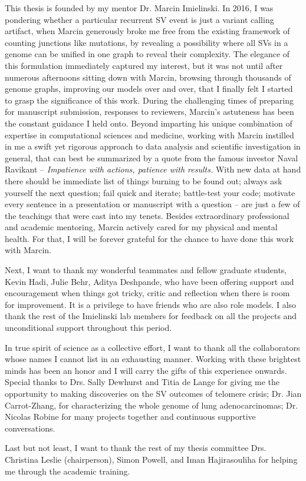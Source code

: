 \documentclass[phd,tocprelim]{cornell}
\begin{document}
\begin{acknowledgements}
    This thesis is founded by my mentor Dr. Marcin Imielinski. In 2016, I was pondering whether a particular recurrent SV event is just a variant calling artifact, when Marcin generously broke me free from the existing framework of counting junctions like mutations, by revealing a possibility where all SVs in a genome can be unified in one graph to reveal their complexity. The elegance of this formulation immediately captured my interest, but it was not until after numerous afternoons sitting down with Marcin, browsing through thousands of genome graphs, improving our models over and over, that I finally felt I started to grasp the significance of this work. During the challenging times of preparing for manuscript submission, responses to reviewers, Marcin's astuteness has been the constant guidance I held onto. Beyond imparting his unique combination of expertise in computational sciences and medicine, working with Marcin instilled in me a swift yet rigorous approach to data analysis and scientific investigation in general, that can best be summarized by a quote from the famous investor Naval Ravikant -- \textit{Impatience with actions, patience with results.} With new data at hand there should be immediate list of things burning to be found out; always ask yourself the next question; fail quick and iterate; battle-test your code; motivate every sentence in a presentation or manuscript with a question -- are just a few of the teachings that were cast into my tenets. Besides extraordinary professional and academic mentoring, Marcin actively cared for my physical and mental health. For that, I will be forever grateful for the chance to have done this work with Marcin.
    
    Next, I want to thank my wonderful teammates and fellow graduate students, Kevin Hadi, Julie Behr, Aditya Deshpande, who have been offering support and encouragement when things got tricky, critic and reflection when there is room for improvement. It is a privilege to have friends who are also role models. I also thank the rest of the Imielinski lab members for feedback on all the projects and unconditional support throughout this period.

    In true spirit of science as a collective effort, I want to thank all the collaborators whose names I cannot list in an exhausting manner. Working with these brightest minds has been an honor and I will carry the gifts of this experience onwards. Special thanks to Drs. Sally Dewhurst and Titia de Lange for giving me the opportunity to making discoveries on the SV outcomes of telomere crisis; Dr. Jian Carrot-Zhang, for characterizing the whole genome of lung adenocarcinomas; Dr. Nicolas Robine for many projects together and continuous supportive conversations.

    Last but not least, I want to thank the rest of my thesis committee Drs. Christina Leslie (chairperson), Simon Powell, and Iman Hajirasouliha for helping me through the academic training.
\end{acknowledgements}
\end{document}
